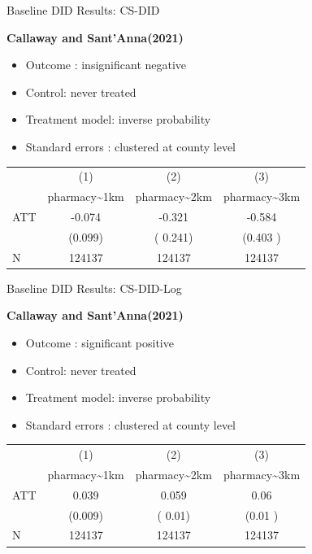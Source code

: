 \documentclass{beamer}
\begin{document}


\begin{frame}{Baseline DID Results: CS-DID}

\textbf{Callaway and Sant'Anna(2021)}

\begin{itemize}
    \item Outcome : insignificant negative
    \item Control: never treated
    \item Treatment model: inverse probability
    \item Standard errors : clustered at  county level
\end{itemize}

\vspace{0.5em}
\centering
\footnotesize
\begin{tabular}{lccc}
\toprule
 & (1) & (2) & (3) \\
 & pharmacy\textasciitilde 1km & pharmacy\textasciitilde 2km & pharmacy\textasciitilde 3km \\
\midrule
ATT &  -0.074  &   -0.321       &    -0.584      \\
    & (0.099) &   ( 0.241)       &  (0.403 )      \\
\midrule
N   &  124137   & 124137   & 124137  \\
\bottomrule
\end{tabular}


\end{frame}



\begin{frame}{Baseline DID Results: CS-DID-Log}

\textbf{Callaway and Sant'Anna(2021)}

\begin{itemize}
    \item Outcome : significant positive
    \item Control: never treated
    \item Treatment model: inverse probability
    \item Standard errors : clustered at  county level
\end{itemize}

\vspace{0.5em}
\centering
\footnotesize
\begin{tabular}{lccc}
\toprule
 & (1) & (2) & (3) \\
 & pharmacy\textasciitilde 1km & pharmacy\textasciitilde 2km & pharmacy\textasciitilde 3km \\
\midrule
ATT &  0.039  &   0.059      &    0.06      \\
    & (0.009) &   ( 0.01)       &  (0.01 )      \\
\midrule
N   &  124137   & 124137   & 124137  \\
\bottomrule
\end{tabular}


\end{frame}
\end{document}
